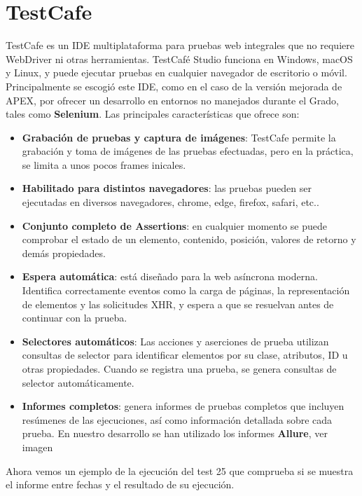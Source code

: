 \section{TestCafe}
TestCafe es un \acrshort{IDE} multiplataforma para pruebas web integrales que no requiere WebDriver ni otras herramientas. TestCafé Studio funciona en Windows, macOS y Linux, y puede ejecutar pruebas en cualquier navegador de escritorio o móvil. ~\cite{TestCodeGuide}
Principalmente se escogió este \acrshort{IDE}, como en el caso de la versión mejorada de \acrshort{APEX}, por ofrecer un desarrollo en entornos no manejados durante el Grado, tales como \textbf{Selenium}. 
Las principales características que ofrece son:
\begin{itemize}
	\item \textbf{Grabación de pruebas y captura de imágenes}: TestCafe permite la grabación y toma de imágenes de las pruebas efectuadas, pero en la práctica, se limita a unos pocos frames inicales.
	\item \textbf{Habilitado para distintos navegadores}: las pruebas pueden ser ejecutadas en diversos navegadores, chrome, edge, firefox, safari, etc..
	\item \textbf{Conjunto completo de Assertions}: en cualquier momento se puede comprobar el estado de un elemento, contenido, posición, valores de retorno y demás propiedades.
	\item \textbf{Espera automática}: está diseñado para la web asíncrona moderna. Identifica correctamente eventos como la carga de páginas, la representación de elementos y las solicitudes \gls{XHR}, y espera a que se resuelvan antes de continuar con la prueba.
	\item \textbf{Selectores automáticos}: Las acciones y aserciones de prueba utilizan consultas de selector para identificar elementos por su clase, atributos, ID u otras propiedades. Cuando se registra una prueba, se genera consultas de selector automáticamente.
	\item \textbf{Informes completos}:  genera informes de pruebas completos que incluyen resúmenes de las ejecuciones, así como información detallada sobre cada prueba. En nuestro desarrollo se han utilizado los informes \textbf{Allure}, ver imagen 
\end{itemize}
Ahora vemos un ejemplo de la ejecución del test 25 que comprueba si se muestra el informe entre fechas y el resultado de su ejecución.

